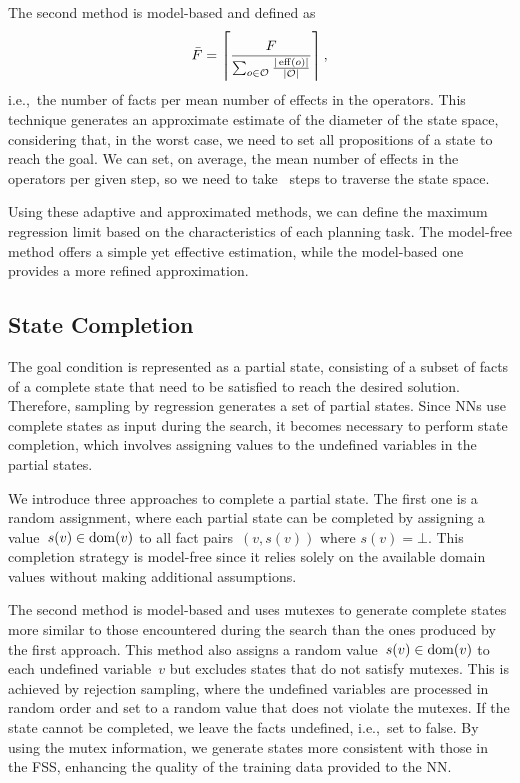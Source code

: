 The second method is model-based and defined as~$$\bar F=\left\lceil \frac{F}{\sum_{o\in \mathcal{O}} \frac{|\operatorname{eff}(o)|}{|\mathcal{O}|}}\right\rceil,$$ i.e.,~the number of facts per mean number of effects in the operators. This technique generates an approximate estimate of the diameter of the state space, considering that, in the worst case, we need to set all propositions of a state to reach the goal. We can set, on average, the mean number of effects in the operators per given step, so we need to take \meanfx~steps to traverse the state space.

Using these adaptive and approximated methods, we can define the maximum regression limit based on the characteristics of each planning task. The model-free method offers a simple yet effective estimation, while the model-based one provides a more refined approximation.

\subsection{State Completion}
\label{sec:state-completion}

The goal condition is represented as a partial state, consisting of a subset of facts of a complete state that need to be satisfied to reach the desired solution. Therefore, sampling by regression generates a set of partial states. Since NNs use complete states as input during the search, it becomes necessary to perform state completion, which involves assigning values to the undefined variables in the partial states.

We introduce three approaches to complete a partial state. The first one is a random assignment, where each partial state can be completed by assigning a value~$s(v) \in \operatorname{dom}(v)$ to all fact pairs~$(v,s(v))$ where $s(v)=\bot$. This completion strategy is model-free since it relies solely on the available domain values without making additional assumptions.

The second method is model-based and uses mutexes to generate complete states more similar to those encountered during the search than the ones produced by the first approach. This method also assigns a random value~$s(v) \in \operatorname{dom}(v)$ to each undefined variable~$v$ but excludes states that do not satisfy mutexes. This is achieved by rejection sampling, where the undefined variables are processed in random order and set to a random value that does not violate the mutexes. If the state cannot be completed, we leave the facts undefined, i.e.,~set to false. By using the mutex information, we generate states more consistent with those in the FSS, enhancing the quality of the training data provided to the NN.

